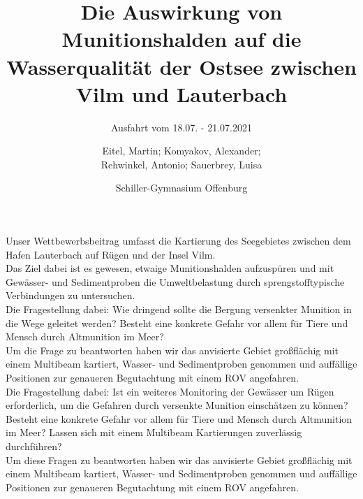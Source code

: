 \documentclass[12pt,titlepage]{scrreprt}
\newcommand{\jens}{Prof. Dr. Jens Greinert }
\begin{document}
% 
\begin{titlepage}

	

\title{Die Auswirkung von Munitionshalden auf die Wasserqualität der Ostsee zwischen Vilm und Lauterbach}
\subtitle{Ausfahrt vom 18.07. - 21.07.2021}
\titlehead{\centering\texttt{[image: Bilder/DSC05220]}}


\author{Eitel, Martin; Komyakov, Alexander; \\ Rehwinkel, Antonio; Sauerbrey, Luisa\\ \and Schiller-Gymnasium Offenburg}

\publishers{Wissenschaftspate: \jens \texttt{jgreinert@geomar.de} \\
\vspace*{2ex} Betreuer: Marek Czernohous \texttt{m.czernohous@schiller-offenburg.de}}

\maketitle

\end{titlepage}
Unser Wettbewerbsbeitrag umfasst die Kartierung des Seegebietes zwischen dem Hafen Lauterbach
auf Rügen und der Insel Vilm. \\ Das Ziel dabei ist es gewesen, etwaige Munitionshalden aufzuspüren 
und mit Gewässer- und Sedimentproben die Umweltbelastung durch sprengstofftypische Verbindungen zu untersuchen.
\\ Die Fragestellung dabei: Wie dringend sollte die Bergung versenkter Munition in die Wege geleitet werden?
Besteht eine konkrete Gefahr vor allem für Tiere und Mensch durch Altmunition im Meer? \\ Um die Frage zu beantworten haben wir das anvisierte Gebiet großflächig mit einem Multibeam kartiert, Wasser- und Sedimentproben genommen und auffällige Positionen zur genaueren Begutachtung mit einem ROV angefahren.\\



Die Fragestellung dabei: Ist ein weiteres Monitoring der Gewässer um Rügen erforderlich, um die Gefahren durch versenkte Munition einschätzen zu können? Besteht eine konkrete Gefahr vor allem für Tiere und Mensch durch Altmunition im Meer? Lassen sich mit einem Multibeam Kartierungen zuverlässig durchführen?\\ Um diese Fragen zu beantworten haben wir das anvisierte Gebiet großflächig mit einem Multibeam kartiert, Wasser- und Sedimentproben genommen und auffällige Positionen zur genaueren Begutachtung mit einem ROV angefahren.\\
\end{document}
